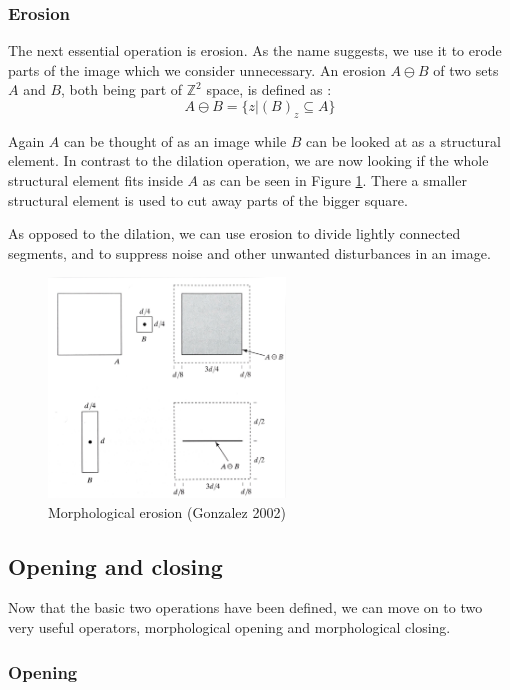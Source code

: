 \documentclass[
  digital,     %
  oneside,     %
  nosansbold,  %
  nocolorbold, %
  lof,         %
  lot,         %
]{fithesis4}
\newcommand*{\Z}{\ensuremath{\mathbb{Z}}}
\begin{document}
\subsubsection{Erosion}

The next essential operation is erosion. As the name suggests, we use it to
erode parts of the image which we consider unnecessary. An erosion $A \ominus B$
of two sets $A$ and $B$, both being part of $\Z^2$ space, is defined as
\cite{gonzalez2002}: $$A \ominus B = \{z | (B)_z \subseteq A\}$$

Again $A$ can be thought of as an image while $B$ can be looked at as a
structural element. In contrast to the dilation operation, we are now looking if
the whole structural element fits inside $A$ as can be seen in Figure
\ref{fig:morph_erosion}. There a smaller structural element is used to cut away
parts of the bigger square.

As opposed to the dilation, we can use erosion to divide lightly connected
segments, and to suppress noise and other unwanted disturbances in an image.

\begin{figure}
    \begin{center}
        \includegraphics[width=6.3cm]{resources/morph_erosion.jpg}
    \end{center}
    \caption{Morphological erosion (Gonzalez 2002)} %
    \label{fig:morph_erosion}
\end{figure}

\subsection{Opening and closing}

Now that the basic two operations have been defined, we can move on to two
very useful operators, morphological opening and morphological closing.

\subsubsection{Opening}
\end{document}
